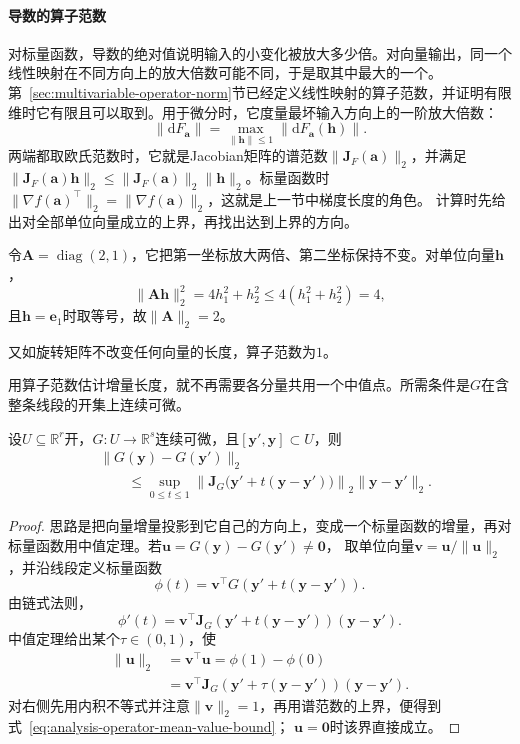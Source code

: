 \paragraph{导数的算子范数}
\label{def:analysis-induced-operator-norm}
对标量函数，导数的绝对值说明输入的小变化被放大多少倍。对向量输出，同一个线性映射在不同方向上的放大倍数可能不同，于是取其中最大的一个。第~\ref{sec:multivariable-operator-norm}节已经定义线性映射的算子范数，并证明有限维时它有限且可以取到。用于微分时，它度量最坏输入方向上的一阶放大倍数：
\[
 \lVert\mathrm dF_{\bm a}\rVert=\max_{\lVert\bm h\rVert\leq1}\lVert\mathrm dF_{\bm a}(\bm h)\rVert .
\]
两端都取欧氏范数时，它就是Jacobian矩阵的谱范数$\lVert\bm J_F(\bm a)\rVert_2$，并满足$\lVert\bm J_F(\bm a)\bm h\rVert_2\leq\lVert\bm J_F(\bm a)\rVert_2\lVert\bm h\rVert_2$。标量函数时$\lVert\nabla f(\bm a)^\top\rVert_2=\lVert\nabla f(\bm a)\rVert_2$，这就是上一节中梯度长度的角色。
计算时先给出对全部单位向量成立的上界，再找出达到上界的方向。
\begin{example}[对角矩阵的算子范数]
\label{ex:multivariable-diagonal-operator-norm}
令$\bm A=\operatorname{diag}(2,1)$，它把第一坐标放大两倍、第二坐标保持不变。对单位向量$\bm h$，
\[
 \lVert\bm A\bm h\rVert_2^2=4h_1^2+h_2^2\leq4(h_1^2+h_2^2)=4,
\]
且$\bm h=\bm e_1$时取等号，故$\lVert\bm A\rVert_2=2$。
\end{example}

又如旋转矩阵不改变任何向量的长度，算子范数为$1$。

用算子范数估计增量长度，就不再需要各分量共用一个中值点。所需条件是$G$在含整条线段的开集上连续可微。
\begin{theorem}[向量值函数的中值估计]
\label{thm:multivariable-vector-mean-value}
设$U\subseteq\mathbb R^r$开，$G:U\to\mathbb R^s$连续可微，且$[\bm y',\bm y]\subset U$，则
\begin{equation}
  \begin{aligned}
  &\lVert G(\bm{y})-G(\bm{y}')\rVert_2\\
  &\qquad\leq
  \sup_{0\leq t\leq1}
  \left\lVert
    \bm J_G\bigl(\bm{y}'+t(\bm{y}-\bm{y}')\bigr)
  \right\rVert_2
  \lVert\bm{y}-\bm{y}'\rVert_2.
  \end{aligned}
\label{eq:analysis-operator-mean-value-bound}
\end{equation}
\end{theorem}
\begin{proof}
思路是把向量增量投影到它自己的方向上，变成一个标量函数的增量，再对标量函数用中值定理。若$\bm u=G(\bm y)-G(\bm y')\neq\bm0$，
取单位向量$\bm v=\bm u/\lVert\bm u\rVert_2$，并沿线段定义标量函数
\[
 \phi(t)=\bm v^\top G(\bm y'+t(\bm y-\bm y')).
\]
由链式法则，
\[
 \phi'(t)=\bm v^\top\bm J_G(\bm y'+t(\bm y-\bm y'))(\bm y-\bm y').
\]
中值定理给出某个$\tau\in(0,1)$，使
\[
 \begin{aligned}
 \lVert\bm u\rVert_2
 &=\bm v^\top\bm u
 =\phi(1)-\phi(0)\\
 &=\bm v^\top\bm J_G(\bm y'+\tau(\bm y-\bm y'))(\bm y-\bm y').
 \end{aligned}
\]
对右侧先用内积不等式并注意$\lVert\bm v\rVert_2=1$，再用谱范数的上界，便得到式~\eqref{eq:analysis-operator-mean-value-bound}；
$\bm u=\bm0$时该界直接成立。
\end{proof}

